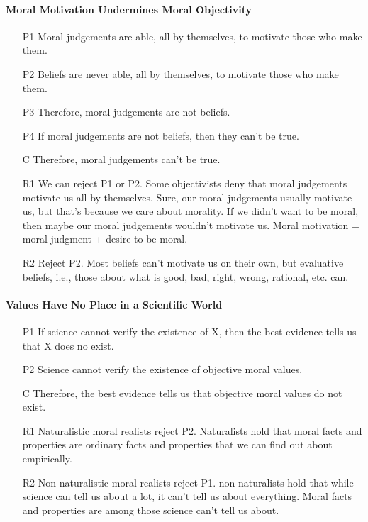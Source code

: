 \documentclass[12pt]{article}
\begin{document}
\paragraph{Moral Motivation Undermines Moral Objectivity}
\begin{itemize}
    \item [P1] Moral judgements are able, all by themselves, to motivate those who make them.
    \item [P2] Beliefs are never able, all by themselves, to motivate those who make them.
    \item [P3] Therefore, moral judgements are not beliefs.
    \item [P4] If moral judgements are not beliefs, then they can't be true.
    \item [C] Therefore, moral judgements can't be true.
    \item [R1] We can reject P1 or P2. Some objectivists deny that moral judgements motivate us all by themselves. Sure, our moral judgements usually motivate us, but that's because we care about morality. If we didn't want to be moral, then maybe our moral judgements wouldn't motivate us. Moral motivation = moral judgment + desire to be moral.
    \item [R2] Reject P2. Most beliefs can't motivate us on their own, but evaluative beliefs, i.e., those about what is good, bad, right, wrong, rational, etc. can.
\end{itemize}

\paragraph{Values Have No Place in a Scientific World}
\begin{itemize}
    \item [P1] If science cannot verify the existence of X, then the best evidence tells us that X does no exist. 
    \item [P2] Science cannot verify the existence of objective moral values.
    \item [C] Therefore, the best evidence tells us that objective moral values do not exist.
    \item [R1] Naturalistic moral realists reject P2. Naturalists hold that moral facts and properties are ordinary facts and properties that we can find out about empirically.
    \item [R2] Non-naturalistic moral realists reject P1. non-naturalists hold that while science can tell us about a lot, it can't tell us about everything. Moral facts and properties are among those science can't tell us about.
\end{itemize}
\end{document}
